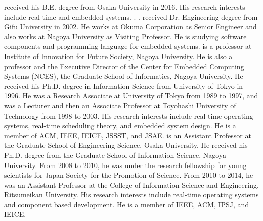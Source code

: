 \begin{biography}
{
received his B.E. degree from Osaka University in 2016.
His research interests include real-time and embedded systems\@.
}
{
\@.
}
{
\@.
}
{
received Dr. Engineering degree from Gifu University in 2002.
He works at Okuma Corporation as Senior Engineer and also works at Nagoya University as Visiting Professor.
He is studying software components and programming language for embedded systems\@.
}
{
is a professor at Institute of Innovation for Future Society, Nagoya University.
He is also a professor and the Executive Director of the Center for Embedded Computing Systems (NCES), the Graduate School of Informatics, Nagoya University.
He received his Ph.D. degree in Information Science from University of Tokyo in 1996.
He was a Research Associate at University of Tokyo from 1989 to 1997, and was a Lecturer and then an Associate Professor at Toyohashi University of Technology from 1998 to 2003.
His research interests include real-time operating systems, real-time scheduling theory, and embedded system design.
He is a member of ACM, IEEE, IEICE, JSSST, and JSAE\@.
}
{
is an Assistant Professor at the Graduate School of Engineering Science, Osaka University. 
He received his Ph.D. degree from the Graduate School of Information Science, Nagoya University.
From 2008 to 2010, he was under the research fellowship for young scientists for Japan Society for the Promotion of Science.
From 2010 to 2014, he was an Assistant Professor at the College of Information Science and Engineering, Ritsumeikan University.
His research interests include real-time operating systems and component based development.
He is a member of IEEE, ACM, IPSJ, and IEICE\@.
}


\end{biography}
